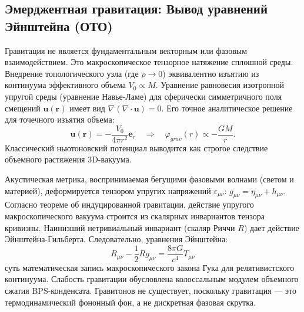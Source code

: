 \documentclass[11pt,a4paper]{article}
\begin{document}
\subsection{Эмерджентная гравитация: Вывод уравнений Эйнштейна (ОТО)}
Гравитация не является фундаментальным векторным или фазовым взаимодействием. Это макроскопическое тензорное натяжение сплошной среды. Внедрение топологического узла (где $\rho \to 0$) эквивалентно изъятию из континуума эффективного объема $V_0 \propto M$. 
Уравнение равновесия изотропной упругой среды (уравнение Навье-Ламе) для сферически симметричного поля смещений $\mathbf{u}(\mathbf{r})$ имеет вид $\nabla(\nabla \cdot \mathbf{u}) = 0$. Его точное аналитическое решение для точечного изъятия объема:
\begin{equation}
\mathbf{u}(\mathbf{r}) = -\frac{V_0}{4\pi r^2}\mathbf{e}_r \quad \Longrightarrow \quad \varphi_{grav}(r) \propto -\frac{GM}{r}.
\end{equation}
Классический ньютоновский потенциал выводится как строгое следствие объемного растяжения 3D-вакуума.

Акустическая метрика, воспринимаемая бегущими фазовыми волнами (светом и материей), деформируется тензором упругих напряжений $\varepsilon_{\mu\nu}$: $g_{\mu\nu} = \eta_{\mu\nu} + h_{\mu\nu}$. Согласно теореме об индуцированной гравитации, действие упругого макроскопического вакуума строится из скалярных инвариантов тензора кривизны. Наинизший нетривиальный инвариант (скаляр Риччи $R$) дает действие Эйнштейна-Гильберта. Следовательно, уравнения Эйнштейна:
\begin{equation}
R_{\mu\nu} - \frac{1}{2}R g_{\mu\nu} = \frac{8\pi G}{c^4} T_{\mu\nu}
\end{equation}
суть математическая запись макроскопического закона Гука для релятивистского континуума. Слабость гравитации обусловлена колоссальным модулем объемного сжатия BPS-конденсата. Гравитонов не существует, поскольку гравитация — это термодинамический фононный фон, а не дискретная фазовая скрутка.
\end{document}
